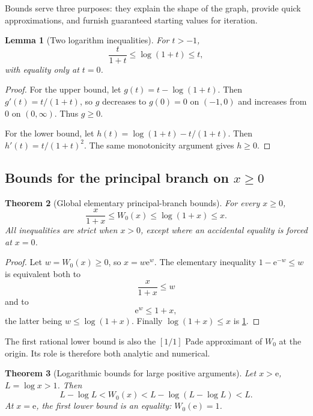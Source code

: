 \documentclass[11pt]{article}
\newtheorem{theorem}{Theorem}[section]
\newtheorem{lemma}[theorem]{Lemma}
\theoremstyle{remark}
\newcommand{\Wz}{W_0}
\newcommand{\ee}{\mathrm e}
\begin{document}
Bounds serve three purposes: they explain the shape of the graph, provide
quick approximations, and furnish guaranteed starting values for iteration.

\begin{lemma}[Two logarithm inequalities]\label{lem:logineq}
For \(t>-1\),
\begin{equation}\label{eq:logineq}
       \frac{t}{1+t}\leq\log(1+t)\leq t,
\end{equation}
with equality only at \(t=0\).
\end{lemma}

\begin{proof}
For the upper bound, let \(g(t)=t-\log(1+t)\).  Then
\(g'(t)=t/(1+t)\), so \(g\) decreases to \(g(0)=0\) on \((-1,0)\) and
increases from \(0\) on \((0,\infty)\).  Thus \(g\geq0\).

For the lower bound, let
\(h(t)=\log(1+t)-t/(1+t)\).  Then
\(h'(t)=t/(1+t)^2\).  The same monotonicity argument gives \(h\geq0\).
\end{proof}

\subsection{Bounds for the principal branch on \texorpdfstring{\(x\geq0\)}{x >= 0}}

\begin{theorem}[Global elementary principal-branch bounds]\label{thm:W0positivebounds}
For every \(x\geq0\),
\begin{equation}\label{eq:W0positivebounds}
 \boxed{\displaystyle
 \frac{x}{1+x}\leq\Wz(x)\leq\log(1+x)\leq x.}
\end{equation}
All inequalities are strict when \(x>0\), except where an accidental equality
is forced at \(x=0\).
\end{theorem}

\begin{proof}
Let \(w=\Wz(x)\geq0\), so \(x=w\ee^w\).  The elementary inequality
\(1-\ee^{-w}\leq w\) is equivalent both to
\[
       \frac{x}{1+x}\leq w
\]
and to
\[
       \ee^w\leq1+x,
\]
the latter being \(w\leq\log(1+x)\).  Finally
\(\log(1+x)\leq x\) is \cref{lem:logineq}.
\end{proof}

The first rational lower bound is also the \([1/1]\) Pade approximant of
\(\Wz\) at the origin.  Its role is therefore both analytic and numerical.

\begin{theorem}[Logarithmic bounds for large positive arguments]\label{thm:W0logbounds}
Let \(x>\ee\), \(L=\log x>1\).  Then
\begin{equation}\label{eq:W0logbounds}
 L-\log L
 <\Wz(x)
 <L-\log(L-\log L)
 <L.
\end{equation}
At \(x=\ee\), the first lower bound is an equality:
\(\Wz(\ee)=1\).
\end{theorem}
\end{document}
